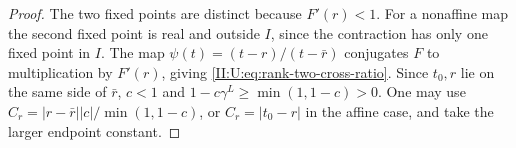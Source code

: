\begin{proof}
The two fixed points are distinct because $F'(r)<1$.
For a nonaffine map the second fixed point is real and outside $I$,
since the contraction has only one fixed point in $I$.
The map $\psi(t)=(t-r)/(t-\bar r)$ conjugates $F$ to multiplication
by $F'(r)$, giving \eqref{II:U:eq:rank-two-cross-ratio}.
Since $t_0,r$ lie on the same side of $\bar r$, $c<1$ and
$1-c\gamma^L\ge\min(1,1-c)>0$. One may use
$C_r=|r-\bar r||c|/\min(1,1-c)$, or $C_r=|t_0-r|$
in the affine case, and take the larger endpoint constant.
\end{proof}
